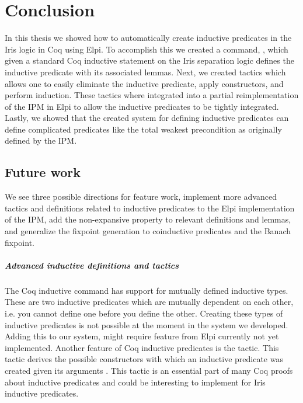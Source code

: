 \documentclass[thesis.tex]{subfiles}
\begin{document}
\VerbatimFootnotes

\chapter{Conclusion}\label{ch:conclusion}
In this thesis we showed how to automatically create inductive predicates in the Iris logic in Coq using Elpi. To accomplish this we created a command, , which given a standard Coq inductive statement on the Iris separation logic defines the inductive predicate with its associated lemmas. Next, we created tactics which allows one to easily eliminate the inductive predicate, apply constructors, and perform induction. These tactics where integrated into a partial reimplementation of the IPM in Elpi to allow the inductive predicates to be tightly integrated. Lastly, we showed that the created system for defining inductive predicates can define complicated predicates like the total weakest precondition as originally defined by the IPM.

\section{Future work}
We see three possible directions for feature work, implement more advanced tactics and definitions related to inductive predicates to the Elpi implementation of the IPM, add the non-expansive property to relevant definitions and lemmas, and generalize the fixpoint generation to coinductive predicates and the Banach fixpoint.

\paragraph{Advanced inductive definitions and tactics}
The Coq inductive command has support for mutually defined inductive types. These are two inductive predicates which are mutually dependent on each other, i.e. you cannot define one before you define the other. Creating these types of inductive predicates is not possible at the moment in the system we developed. Adding this to our system, might require feature from Elpi currently not yet implemented. Another feature of Coq inductive predicates is the  tactic. This tactic derives the possible constructors with which an inductive predicate was created given its arguments \cite{cornesAutomatingInversionInductive1996}. This tactic is an essential part of many Coq proofs about inductive predicates and could be interesting to implement for Iris inductive predicates.
\end{document}
